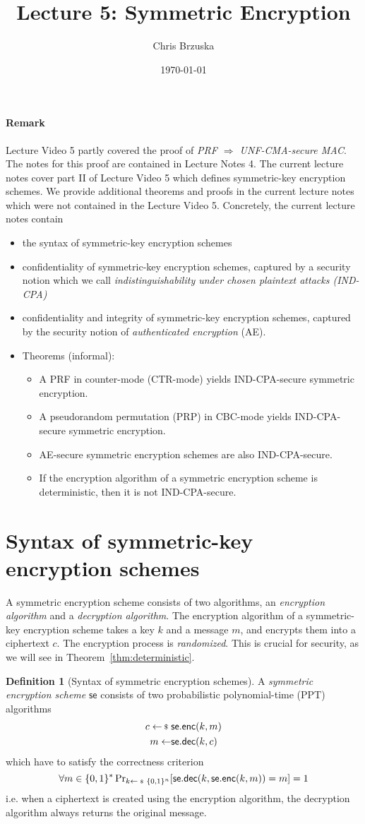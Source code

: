 \documentclass[a4paper,table,dvipsnames]{article}
\title{Lecture 5: Symmetric Encryption}
\author{Chris Brzuska}
\date{\today}
\theoremstyle{definition}
\newtheorem{definition}{Definition}[section]
\renewcommand{\O}[1]{\ensuremath{\mathsf{#1}}}
\newcommand{\se}{\O{se}} %
\renewcommand{\enc}{\O{enc}} %
\renewcommand{\dec}{\O{dec}} %
\begin{document}
\paragraph{Remark} Lecture Video 5 partly covered the proof of \emph{PRF $\Rightarrow$ UNF-CMA-secure MAC}. The notes
for this proof are contained in Lecture Notes 4. The current lecture notes cover part II of Lecture Video 5 which
defines symmetric-key encryption schemes. We provide additional theorems and proofs in the current lecture notes which
were not contained in the Lecture Video 5. Concretely,
the current lecture notes contain
\begin{itemize}
\item the syntax of symmetric-key encryption schemes
\item confidentiality of symmetric-key encryption schemes, captured by a security notion which we call \emph{indistinguishability under chosen plaintext attacks (IND-CPA)}
\item confidentiality and integrity of symmetric-key encryption schemes, captured by the security notion of \emph{authenticated encryption} (AE).
\item Theorems (informal):
\begin{itemize}
\item A PRF in counter-mode (CTR-mode) yields IND-CPA-secure symmetric encryption.
\item A pseudorandom permutation (PRP) in CBC-mode yields IND-CPA-secure symmetric encryption.
\item AE-secure symmetric encryption schemes are also IND-CPA-secure. 
\item If the encryption algorithm of a symmetric encryption scheme is deterministic, then it is not IND-CPA-secure. 
\end{itemize}
\end{itemize}


\section{Syntax of symmetric-key encryption schemes}
A symmetric encryption scheme consists of two algorithms, an \emph{encryption algorithm}
and a \emph{decryption algorithm}. The encryption algorithm of a symmetric-key encryption
scheme takes a key $k$ and a message $m$, and encrypts them into a ciphertext $c$. The
encryption process is \emph{randomized}. This is crucial for security, as we will
see in Theorem~\ref{thm:deterministic}.
\begin{definition}[Syntax of symmetric encryption schemes]
  A \emph{symmetric encryption scheme} $\se$ consists of two probabilistic polynomial-time (PPT) algorithms
  \begin{align*}
	c \sample&\se.\enc(k,m) \\
	m\gets&\se.\dec(k,c)
  \end{align*} 
  which have to satisfy the correctness criterion
  \[\forall m\in\bin^* \probsub{k\sample\bin^n}{\se.\dec(k,\se.\enc(k,m))=m}=1\]
  i.e. when a ciphertext is created using the encryption algorithm, the decryption algorithm always returns the original message.
\end{definition}
\end{document}
